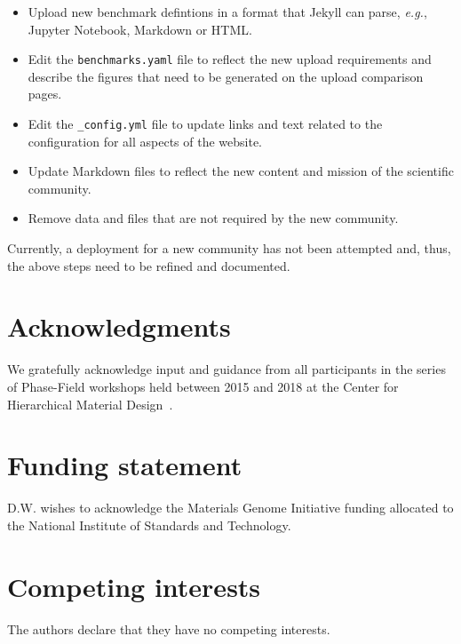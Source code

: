 \documentclass{jors}
\begin{document}
\begin{itemize}
  \item Upload new benchmark defintions in a format that Jekyll can
    parse, \emph{e.g.}, Jupyter Notebook, Markdown or HTML.
  \item Edit the \texttt{benchmarks.yaml} file to reflect the new
    upload requirements and describe the figures that need to be
    generated on the upload comparison pages.
  \item Edit the \texttt{\_config.yml} file to update links and text
    related to the configuration for all aspects of the website.
  \item Update Markdown files to reflect the new content and mission
    of the scientific community.
  \item Remove data and files that are not required by the new
    community.
\end{itemize}

Currently, a deployment for a new community has not been attempted
and, thus, the above steps need to be refined and documented.

\section*{Acknowledgments}

We gratefully acknowledge input and guidance from all participants in
the series of Phase-Field workshops held between 2015 and 2018 at the
Center for Hierarchical Material Design~\cite{workshops}.

\section*{Funding statement}

D.W. wishes to acknowledge the Materials Genome Initiative funding
allocated to the National Institute of Standards and Technology.

\section*{Competing interests}

The authors declare that they have no competing interests.

\printbibliography
\end{document}
